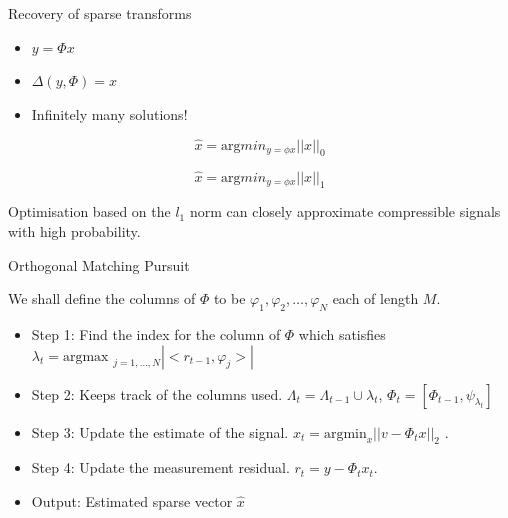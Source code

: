 \documentclass{beamer}
\begin{document}
      \begin{frame}{Recovery of sparse transforms}
        \begin{itemize}
\item $y = \Phi x$
          \item $\Delta(y, \Phi) = x$
\item Infinitely many solutions!
        \end{itemize}

\begin{equation*}
  \label{eq:3}
  \hat{x} = \text{arg} min_{y = \phi x} ||x||_0
\end{equation*}

\begin{equation*}
  \label{eq:3}
  \hat{x} = \text{arg} min_{y = \phi x} ||x||_1
\end{equation*}

Optimisation based on the $l_1$ norm can closely approximate compressible signals with high probability.

\end{frame}


\begin{frame}{Orthogonal Matching Pursuit}

 We shall define the columns of $\Phi$ to be $\varphi_1, \varphi_2, \hdots, \varphi_N$ each of length $M$. 

\begin{itemize}
\item Step 1: Find the index for the column of $\Phi$ which satisfies $\lambda_t = \text{argmax }_{j=1,\hdots,N}|<r_{t-1}, \varphi_j>|$ 
\item Step 2: Keeps track of the columns used. $\Lambda_t = \Lambda_{t-1} \cup {\lambda_t}$, $\Phi_t = [\Phi_{t-1}, \psi_{\lambda_t}]$ 
\item Step 3: Update the estimate of the signal.  $x_t = \text{argmin}_x || v - \Phi_tx||_2$ .
\item Step 4: Update the measurement residual. $r_t =  y - \Phi_t x_t$.  
\item Output: Estimated sparse vector $\hat{x}$
\end{itemize}


  
\end{frame}
   
\end{document}

